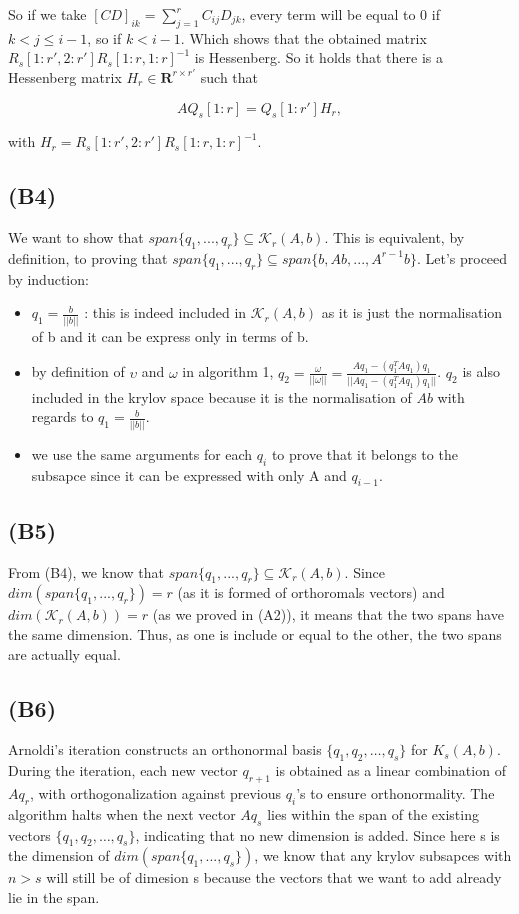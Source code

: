 \documentclass{article}
\begin{document}
So if we take \([CD]_{ik}=\sum_{j=1}^{r}C_{ij}D_{jk}\), every term will be equal to \(0\) if \(k<j\leq i-1\), so if \(k < i-1\). Which shows that the obtained matrix \(R_s[1:r', 2:r']R_s[1:r, 1:r]^{-1}\) is Hessenberg. So it holds that there is a Hessenberg matrix \(H_r\in \mathbf{R}^{r\times r'}\) such that

\[
A Q_s[1:r]  = Q_s[1:r'] H_r,
\]

with \(H_r=R_s[1:r', 2:r']R_s[1:r, 1:r]^{-1}\).


\subsection*{(B4)}
We want to show that $span\{q_1, ... , q_r\} \subseteq \mathcal{K}_r(A,b)$. This is equivalent, by definition, 
to proving that  $span\{q_1, ... , q_r\} \subseteq span \{ b, Ab,..., A^{r-1}b\}$.
Let's proceed by induction: 
\begin{itemize}
    \item $q_1 = \frac{b}{||b||}$ : this is indeed included in $\mathcal{K}_r(A,b)$ as it is just the normalisation of b
    and it can be express only in terms of b. 
    \item by definition of $\upsilon$ and $ \omega$ in algorithm 1, 
    $q_2 = \frac{\omega}{||\omega||} = \frac{A q_1 - (q_1^T A q_1)q_1}{||A q_1 - (q_1^T A q_1)q_1||}$. $q_2$ is also included in the krylov space because it is the normalisation of $Ab$ with regards to $q_1 = \frac{b}{||b||}$. 
    \item we use the same arguments for each $q_i$ to prove that it belongs to the subsapce since it can be expressed with only A and $q_{i-1}$. 
\end{itemize}

\subsection*{(B5)}
From (B4), we know that $span\{q_1, ... , q_r\} \subseteq \mathcal{K}_r(A,b)$.
Since $dim(span\{q_1, ... , q_r\}) = r$ (as it is formed of orthoromals vectors)
and $dim(\mathcal{K}_r(A,b)) = r$ (as we proved in (A2)), it means that the two spans have the same dimension. 
Thus, as one is include or equal to the other, the two spans are actually equal. 

\subsection*{(B6)}


Arnoldi's iteration constructs an orthonormal basis $ \{ q_1, q_2, \dots, q_s \} $ 
for $ K_s(A, b) $. 
During the iteration, each new vector $ q_{r+1} $ is obtained as a linear combination of $ A q_r $, 
with orthogonalization against previous $ q_i $'s to ensure orthonormality. The algorithm halts when the next vector $ A q_s $ lies within the span of the existing vectors $ \{ q_1, q_2, \dots, q_s \} $, indicating that no new dimension is added.
Since here s is the dimension of $dim(span\{q_1, ... , q_s\})$, we know that any krylov subsapces with $n>s$ will still
be of dimesion s because the vectors that we want to add already lie in the span. 
\end{document}
